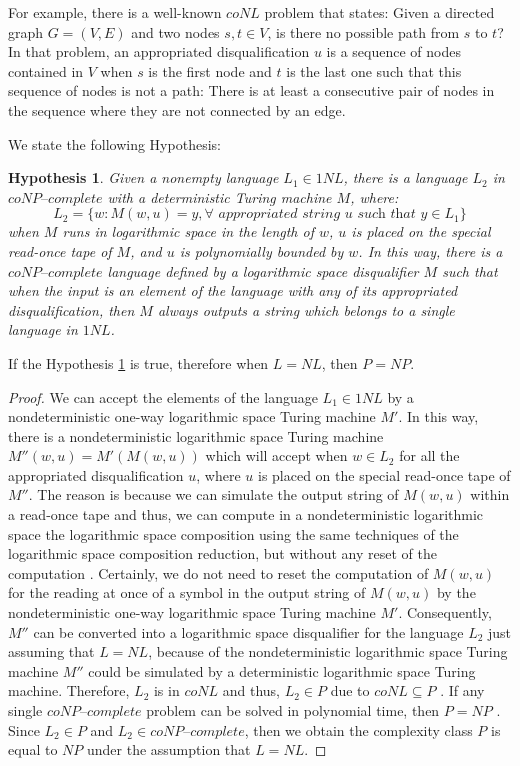 \documentclass[a4paper,UKenglish,cleveref, autoref]{lipics-v2019}
\newtheorem{hypothesis}[theorem]{Hypothesis}
\begin{document}
For example, there is a well-known $coNL$ problem that states: Given a directed graph $G = (V, E)$ and two nodes $s, t \in V$, is there no possible path from $s$ to $t$? In that problem, an appropriated disqualification $u$ is a sequence of nodes contained in $V$ when $s$ is the first node and $t$ is the last one such that this sequence of nodes is not a path: There is at least a consecutive pair of nodes in the sequence where they are not connected by an edge.

We state the following Hypothesis:

\begin{hypothesis}
\label{hypothesis2}
Given a nonempty language $L_{1} \in 1NL$, there is a language $L_{2}$ in $\textit{coNP--complete}$ with a deterministic Turing machine $M$, where:
\[L_{2} = \{w: M(w, u) = y, \forall \textit{ appropriated string } u \textit{ such that } y \in L_{1}\}\]
when $M$ runs in logarithmic space in the length of $w$, $u$ is placed on the special read-once tape of $M$, and $u$ is polynomially bounded by $w$. In this way, there is a $\textit{coNP--complete}$ language defined by a logarithmic space disqualifier $M$ such that when the input is an element of the language with any of its appropriated disqualification, then $M$ always outputs a string which belongs to a single language in $1NL$.
\end{hypothesis}

\begin{theorem}
\label{pos-implication}
If the Hypothesis \ref{hypothesis2} is true, therefore when $L = NL$, then $P = NP$.
\end{theorem}

\begin{proof}
We can accept the elements of the language $L_{1} \in 1NL$ by a nondeterministic one-way logarithmic space Turing machine $M'$. In this way, there is a nondeterministic logarithmic space Turing machine $M''(w, u) = M'(M(w, u))$ which will accept when $w \in L_{2}$ for all the appropriated disqualification $u$, where $u$ is placed on the special read-once tape of $M''$. The reason is because we can simulate the output string of $M(w, u)$ within a read-once tape and thus, we can compute in a nondeterministic logarithmic space the logarithmic space composition using the same techniques of the logarithmic space composition reduction, but without any reset of the computation \cite{Pap03}. Certainly, we do not need to reset the computation of $M(w, u)$ for the reading at once of a symbol in the output string of $M(w, u)$ by the nondeterministic one-way logarithmic space Turing machine $M'$. Consequently, $M''$ can be converted into a logarithmic space disqualifier for the language $L_{2}$ just assuming that $L = NL$, because of the nondeterministic logarithmic space Turing machine $M''$ could be simulated by a deterministic logarithmic space Turing machine. Therefore, $L_{2}$ is in $coNL$ and thus, $L_{2} \in P$ due to $coNL \subseteq P$ \cite{Pap03}. If any single $\textit{coNP--complete}$ problem can be solved in polynomial time, then $P = NP$ \cite{Pap03}. Since $L_{2} \in P$ and $L_{2} \in \textit{coNP--complete}$, then we obtain the complexity class $P$ is equal to $NP$ under the assumption that $L = NL$.
\end{proof}
\end{document}
